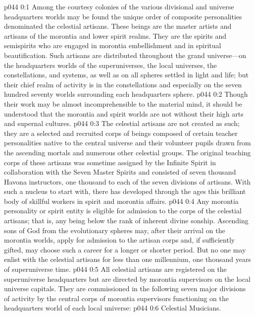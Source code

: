 \author{Archangel}
\vs p044 0:1 Among the courtesy colonies of the various divisional and universe headquarters worlds may be found the unique order of composite personalities denominated the celestial artisans. These beings are the master artists and artisans of the morontia and lower spirit realms. They are the spirits and semispirits who are engaged in morontia embellishment and in spiritual beautification. Such artisans are distributed throughout the grand universe---on the headquarters worlds of the superuniverses, the local universes, the constellations, and systems, as well as on all spheres settled in light and life; but their chief realm of activity is in the constellations and especially on the seven hundred seventy worlds surrounding each headquarters sphere.
\vs p044 0:2 Though their work may be almost incomprehensible to the material mind, it should be understood that the morontia and spirit worlds are not without their high arts and supernal cultures.
\pc \vs p044 0:3 The celestial artisans are not created as such; they are a selected and recruited corps of beings composed of certain teacher personalities native to the central universe and their volunteer pupils drawn from the ascending mortals and numerous other celestial groups. The original teaching corps of these artisans was sometime assigned by the Infinite Spirit in collaboration with the Seven Master Spirits and consisted of seven thousand Havona instructors, one thousand to each of the seven divisions of artisans. With such a nucleus to start with, there has developed through the ages this brilliant body of skillful workers in spirit and morontia affairs.
\vs p044 0:4 Any morontia personality or spirit entity is eligible for admission to the corps of the celestial artisans; that is, any being below the rank of inherent divine sonship. Ascending sons of God from the evolutionary spheres may, after their arrival on the morontia worlds, apply for admission to the artisan corps and, if sufficiently gifted, may choose such a career for a longer or shorter period. But no one may enlist with the celestial artisans for less than one millennium, one thousand years of superuniverse time.
\vs p044 0:5 All celestial artisans are registered on the superuniverse headquarters but are directed by morontia supervisors on the local universe capitals. They are commissioned in the following seven major divisions of activity by the central corps of morontia supervisors functioning on the headquarters world of each local universe:
\pc \vs p044 0:6 \bibnobreakspace Celestial Musicians.
